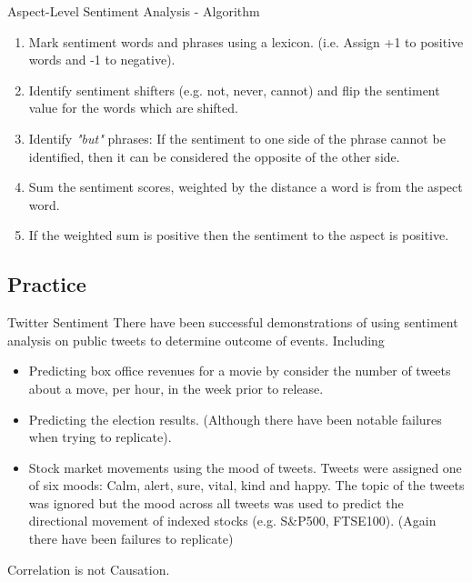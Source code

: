 \documentclass[11pt,a4paper]{article}
\begin{document}
  \begin{proposition}{Aspect-Level Sentiment Analysis - Algorithm}
    \begin{enumerate}
      \item Mark sentiment words and phrases using a lexicon. (i.e. Assign +1 to positive words and -1 to negative).
      \item Identify sentiment shifters (e.g. not, never, cannot) and flip the sentiment value for the words which are shifted.
      \item Identify \textit{"but"} phrases: If the sentiment to one side of the phrase cannot be identified, then it can be considered the opposite of the other side.
      \item Sum the sentiment scores, weighted by the distance a word is from the aspect word.
      \item If the weighted sum is positive then the sentiment to the aspect is positive.
    \end{enumerate}
  \end{proposition}

\subsection{Practice}

  \begin{proposition}{Twitter Sentiment}
    There have been successful demonstrations of using sentiment analysis on public tweets to determine outcome of events. Including
    \begin{itemize}
      \item Predicting box office revenues for a movie by consider the number of tweets about a move, per hour, in the week prior to release.
      \item Predicting the election results. (Although there have been notable failures when trying to replicate).
      \item Stock market movements using the mood of tweets. Tweets were assigned one of six moods: Calm, alert, sure, vital, kind and happy. The topic of the tweets was ignored but the mood across all tweets was used to predict the directional movement of indexed stocks (e.g. S\&P500, FTSE100). (Again there have been failures to replicate)
    \end{itemize}
  \end{proposition}

  \begin{remark}{Correlation is not Causation.}

  \end{remark}
\end{document}
